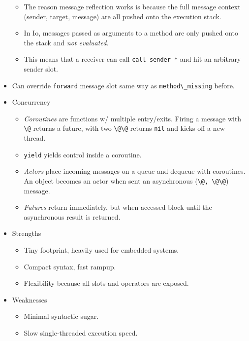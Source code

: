 \documentclass[10pt]{article}
\begin{document}
\begin{itemize}
        \begin{itemize}
            \item The reason message reflection works is because the full
                message context (sender, target, message) are all pushed onto
                the execution stack.
            \item In Io, messages passed as arguments to a method are only
                pushed onto the stack and \emph{not evaluated}.
            \item This means that a receiver can call \lstinline{call sender *} and
                hit an arbitrary sender slot.
        \end{itemize}
    \item Can override \lstinline{forward} message slot same way as
        \lstinline{method\_missing} before.
    \item Concurrency
        \begin{itemize}
            \item \emph{Coroutines} are functions w/ multiple entry/exits. Firing a
                message with \lstinline{\@} returns a future, with two
                \lstinline{\@\@} returns \lstinline{nil} and kicks off a new thread.
            \item \lstinline{yield} yields control inside a coroutine.
            \item \emph{Actors} place incoming messages on a queue and dequeue
                with coroutines. An object becomes an actor when sent an
                asynchronous (\lstinline{\@, \@\@}) message.
            \item \emph{Futures} return immediately, but when accessed block
                until the asynchronous result is returned.
        \end{itemize}
    \item Strengths
        \begin{itemize}
            \item Tiny footprint, heavily used for embedded systems.
            \item Compact syntax, fast rampup.
            \item Flexibility because all slots and operators are exposed.
        \end{itemize}
    \item Weaknesses
        \begin{itemize}
            \item Minimal syntactic sugar.
            \item Slow single-threaded execution speed.
        \end{itemize}
\end{itemize}
\end{document}

